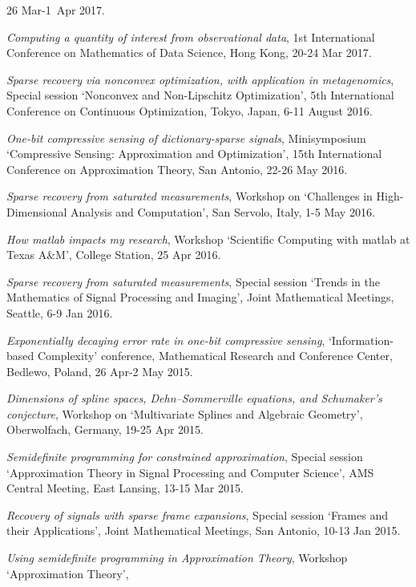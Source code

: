 \documentclass[11pt]{article}
\begin{document}
26 Mar-1~Apr 2017.
\item {\sl Computing a quantity of interest from observational data}, 1st International Conference on Mathematics of Data Science,
Hong Kong, 20-24 Mar 2017.
\item {\sl Sparse recovery via nonconvex optimization, with application in metagenomics},
Special session `Nonconvex and Non-Lipschitz Optimization',
5th International Conference on Continuous Optimization, Tokyo, Japan, 6-11 August 2016.
\item{\sl One-bit compressive sensing of dictionary-sparse signals},
Minisymposium `Compressive Sensing: Approximation and Optimization',
15th International Conference on Approximation Theory, San Antonio, 22-26 May 2016.
\item {\sl Sparse recovery from saturated measurements},
Workshop on `Challenges in High-Dimensional Analysis and Computation',
San Servolo, Italy, 1-5 May 2016.
\item {\sl How {\sc matlab} impacts my research},
Workshop `Scientific Computing with {\sc matlab} at Texas A\&M',
College Station, 25 Apr 2016. 
\item {\sl Sparse recovery from saturated measurements},
Special session `Trends in the Mathematics of Signal Processing and Imaging',
Joint Mathematical Meetings, Seattle, 6-9 Jan 2016.
\item {\sl Exponentially decaying error rate in one-bit compressive sensing}, `Information-based Complexity' conference, 
Mathematical Research and Conference Center, Bedlewo, Poland,
26 Apr-2 May 2015.
\item {\sl Dimensions of spline spaces, Dehn--Sommerville equations, and Schumaker’s conjecture},
Workshop on `Multivariate Splines and Algebraic Geometry', Oberwolfach, Germany, 19-25 Apr 2015.
\item {\sl Semidefinite programming for constrained approximation}, Special session `Approximation Theory in Signal Processing and Computer Science', AMS \mbox{Central} Meeting, East Lansing, 13-15 Mar 2015.
\item {\sl Recovery of signals with sparse frame expansions}, Special session `Frames and their Applications', Joint Mathematical Meetings, San Antonio, 10-13 Jan 2015. 
\item {\sl Using semidefinite programming in Approximation Theory}, Workshop `Approximation Theory',
\end{document}

